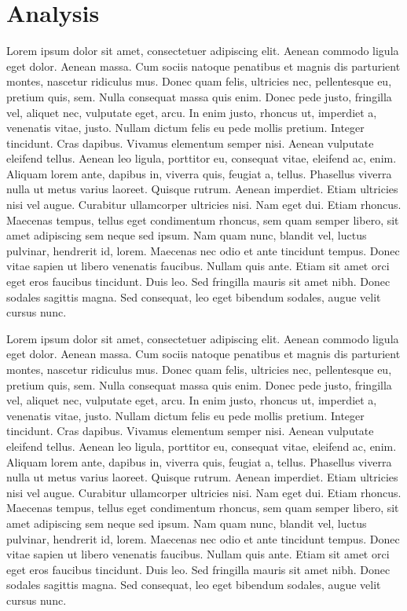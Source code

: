 \chapter{Analysis}

Lorem ipsum dolor sit amet, consectetuer adipiscing elit. Aenean commodo ligula eget dolor. Aenean massa. Cum sociis natoque penatibus et magnis dis parturient montes, nascetur ridiculus mus. Donec quam felis, ultricies nec, pellentesque eu, pretium quis, sem. Nulla consequat massa quis enim. Donec pede justo, fringilla vel, aliquet nec, vulputate eget, arcu. In enim justo, rhoncus ut, imperdiet a, venenatis vitae, justo. Nullam dictum felis eu pede mollis pretium. Integer tincidunt. Cras dapibus. Vivamus elementum semper nisi. Aenean vulputate eleifend tellus. Aenean leo ligula, porttitor eu, consequat vitae, eleifend ac, enim. Aliquam lorem ante, dapibus in, viverra quis, feugiat a, tellus. Phasellus viverra nulla ut metus varius laoreet. Quisque rutrum. Aenean imperdiet. Etiam ultricies nisi vel augue. Curabitur ullamcorper ultricies nisi. Nam eget dui. Etiam rhoncus. Maecenas tempus, tellus eget condimentum rhoncus, sem quam semper libero, sit amet adipiscing sem neque sed ipsum. Nam quam nunc, blandit vel, luctus pulvinar, hendrerit id, lorem. Maecenas nec odio et ante tincidunt tempus. Donec vitae sapien ut libero venenatis faucibus. Nullam quis ante. Etiam sit amet orci eget eros faucibus tincidunt. Duis leo. Sed fringilla mauris sit amet nibh. Donec sodales sagittis magna. Sed consequat, leo eget bibendum sodales, augue velit cursus nunc.

Lorem ipsum dolor sit amet, consectetuer adipiscing elit. Aenean commodo ligula eget dolor. Aenean massa. Cum sociis natoque penatibus et magnis dis parturient montes, nascetur ridiculus mus. Donec quam felis, ultricies nec, pellentesque eu, pretium quis, sem. Nulla consequat massa quis enim. Donec pede justo, fringilla vel, aliquet nec, vulputate eget, arcu. In enim justo, rhoncus ut, imperdiet a, venenatis vitae, justo. Nullam dictum felis eu pede mollis pretium. Integer tincidunt. Cras dapibus. Vivamus elementum semper nisi. Aenean vulputate eleifend tellus. Aenean leo ligula, porttitor eu, consequat vitae, eleifend ac, enim. Aliquam lorem ante, dapibus in, viverra quis, feugiat a, tellus. Phasellus viverra nulla ut metus varius laoreet. Quisque rutrum. Aenean imperdiet. Etiam ultricies nisi vel augue. Curabitur ullamcorper ultricies nisi. Nam eget dui. Etiam rhoncus. Maecenas tempus, tellus eget condimentum rhoncus, sem quam semper libero, sit amet adipiscing sem neque sed ipsum. Nam quam nunc, blandit vel, luctus pulvinar, hendrerit id, lorem. Maecenas nec odio et ante tincidunt tempus. Donec vitae sapien ut libero venenatis faucibus. Nullam quis ante. Etiam sit amet orci eget eros faucibus tincidunt. Duis leo. Sed fringilla mauris sit amet nibh. Donec sodales sagittis magna. Sed consequat, leo eget bibendum sodales, augue velit cursus nunc.

